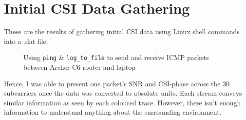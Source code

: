 \section{Initial CSI Data Gathering}
These are the results of gathering initial CSI data using Linux shell commands into a .dat file.
\begin{figure}[H]%
    \centering
    \qquad
    \caption{Using \lstinline{ping} \& \lstinline{log_to_file} to send and receive ICMP packets between Archer C6 router and laptop}%
    \label{fig:UbuntuTerminals}%
\end{figure}
Hence, I was able to present one packet's SNR and CSI-phase across the 30 subcarriers once the data was converted to absolute units. Each stream conveys similar information as seen by each coloured trace. However, there isn't enough information to understand anything about the surrounding environment. 
